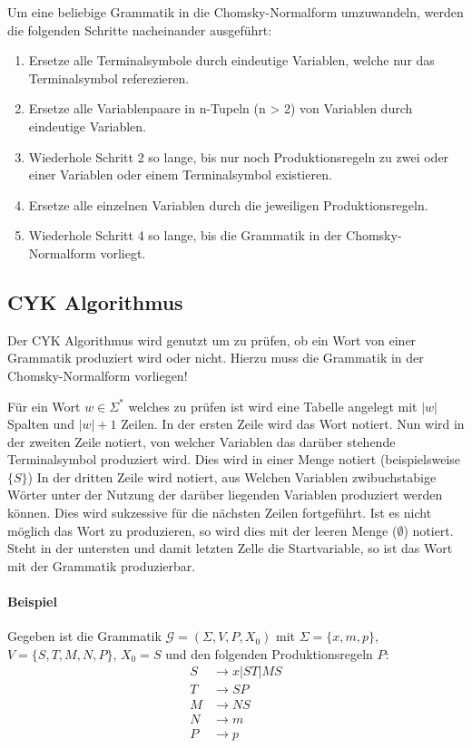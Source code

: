 		Um eine beliebige Grammatik in die Chomsky-Normalform umzuwandeln, werden die folgenden Schritte nacheinander ausgeführt:
		\begin{enumerate}
			\item Ersetze alle Terminalsymbole durch eindeutige Variablen, welche nur das Terminalsymbol referezieren.
			\item Ersetze alle Variablenpaare in n-Tupeln (n > 2) von Variablen durch eindeutige Variablen.
			\item Wiederhole Schritt 2 so lange, bis nur noch Produktionsregeln zu zwei oder einer Variablen oder einem Terminalsymbol existieren.
			\item Ersetze alle einzelnen Variablen durch die jeweiligen Produktionsregeln.
			\item Wiederhole Schritt 4 so lange, bis die Grammatik in der Chomsky-Normalform vorliegt.
		\end{enumerate}


	\subsection{CYK Algorithmus}
		Der CYK Algorithmus wird genutzt um zu prüfen, ob ein Wort von einer Grammatik produziert wird oder nicht. Hierzu muss die Grammatik in der Chomsky-Normalform vorliegen!

		Für ein Wort $ w \in \Sigma ^ * $ welches zu prüfen ist wird eine Tabelle angelegt mit $ \vert w \vert $ Spalten und $ \vert w \vert + 1 $ Zeilen. In der ersten Zeile wird das Wort notiert. Nun wird in der zweiten Zeile notiert, von welcher Variablen das darüber stehende Terminalsymbol produziert wird. Dies wird in einer Menge notiert (beispielsweise $ \{ S \} $) In der dritten Zeile wird notiert, aus Welchen Variablen zwibuchstabige Wörter unter der Nutzung der darüber liegenden Variablen produziert werden können. Dies wird sukzessive für die nächsten Zeilen fortgeführt. Ist es nicht möglich das Wort zu produzieren, so wird dies mit der leeren Menge ($ \emptyset $) notiert. Steht in der untersten und damit letzten Zelle die Startvariable, so ist das Wort mit der Grammatik produzierbar.

		\paragraph{Beispiel}
			Gegeben ist die Grammatik $ \mathcal{G} = (\Sigma, V, P, X _ 0) $ mit $ \Sigma = \{ x, m, p \} $, $ V = \{ S, T, M, N, P \} $, $ X _ 0 = S $ und den folgenden Produktionsregeln $ P $:
			\begin{equation*}
				\begin{split}
					S & \rightarrow x | ST | MS \\
					T & \rightarrow SP          \\
					M & \rightarrow NS          \\
					N & \rightarrow m           \\
					P & \rightarrow p           \\
				\end{split}
			\end{equation*}

